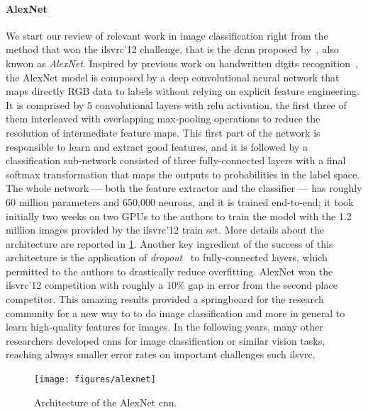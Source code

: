 \paragraph{AlexNet}
We start our review of relevant work in image classification right from the method that won the \gls{ilsvrc}'12 challenge, that is the \gls{dcnn} proposed by~\citet{krizhevsky2012imagenet}, also knwon as \emph{AlexNet}.
Inspired by previous work on handwritten digits recognition~\cite{lecun1989backpropagation}, the AlexNet model is composed by a deep convolutional neural network that maps directly RGB data to labels without relying on explicit feature engineering.
It is comprised by 5 convolutional layers with \gls{relu} activation, the first three of them interleaved with overlapping max-pooling operations to reduce the resolution of intermediate feature maps.
This first part of the network is responsible to learn and extract good features, and it is followed by a classification sub-network consisted of three fully-connected layers with a final softmax transformation that maps the outputs to probabilities in the label space.
The whole network --- both the feature extractor and the classifier --- has roughly 60 million parameters and 650,000 neurons, and it is trained end-to-end;
it took initially two weeks on two GPUs to the authors to train the model with the 1.2 million images provided by the \gls{ilsvrc}'12 train set.
More details about the architecture are reported in \ref{fig:back:alexnet}.
Another key ingredient of the success of this architecture is the application of \emph{dropout}~\cite{hinton2012improving} to fully-connected layers, which permitted to the authors to drastically reduce overfitting.
AlexNet won the \gls{ilsvrc}'12 competition with roughly a 10\% gap in error from the second place competitor.
This amazing results provided a springboard for the research community for a new way to to do image classification and more in general to learn high-quality features for images.
In the following years, many other researchers developed \glspl{cnn} for image classification or similar vision tasks, reaching always smaller error rates on important challenges such \gls{ilsvrc}.

\begin{figure}
    \centering
    \texttt{[image: figures/alexnet]}
    \caption{Architecture of the AlexNet \gls{cnn}.}
    \label{fig:back:alexnet}
\end{figure}

